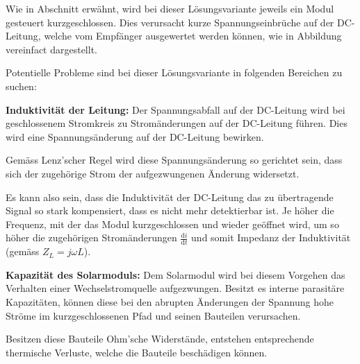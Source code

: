 Wie in Abschnitt  erw\"ahnt, wird bei dieser L\"osungsvariante
jeweils   ein   Modul   gesteuert   kurzgeschlossen. Dies   verursacht   kurze
Spannungseinbr\"uche auf  der DC-Leitung,  welche vom  Empf\"anger ausgewertet
werden k\"onnen, wie in Abbildung vereinfact dargestellt.

Potentielle Probleme sind bei  dieser L\"osungsvariante in folgenden Bereichen
zu suchen:

\begin{symbols}
    \firmlist
    \item[\textbf{Induktivit\"at der Leitung:}]
        Der  Spannungsabfall   auf  der  DC-Leitung  wird   bei  geschlossenem
        Stromkreis zu Strom\"anderungen auf der DC-Leitung f\"uhren. Dies wird
        eine Spannungs\"anderung auf der DC-Leitung bewirken\footnotemark.

        Gem\"ass    Lenz'scher     Regel         wird    diese
        Spannungs\"anderung  so gerichtet  sein,  dass  sich der  zugeh\"orige
        Strom der aufgezwungenen \"Anderung widersetzt.

        Es  kann also  sein, dass  die  Induktivit\"at der  DC-Leitung das  zu
        \"ubertragende  Signal  so  stark  kompensiert,  dass  es  nicht  mehr
        detektierbar  ist. Je   h\"oher  die  Frequenz,  mit   der  das  Modul
        kurzgeschlossen  und  wieder  ge\"offnet   wird,  um  so  h\"oher  die
        zugeh\"origen Strom\"anderungen
        $\frac{\mathrm{d}i}{\mathrm{d}{t}}$
        und somit Impedanz der Induktivit\"at (gem\"ass
        $Z_L = j \omega L$).
    \item[\textbf{Kapazit\"at des Solarmoduls:}]
        Dem  Solarmodul   wird  bei   diesem  Vorgehen  das   Verhalten  einer
        Wechselstromquelle   aufgezwungen. Besitzt  es   interne  parasit\"are
        Kapazit\"aten,  k\"onnen  diese  bei  den  abrupten  \"Anderungen  der
        Spannung hohe Str\"ome im  kurzgeschlossenen Pfad und seinen Bauteilen
        verursachen.\footnotemark

        Besitzen    diese   Bauteile    Ohm'sche   Widerst\"ande,    entstehen
        entsprechende thermische  Verluste, welche die  Bauteile besch\"adigen
        k\"onnen.
\end{symbols}

